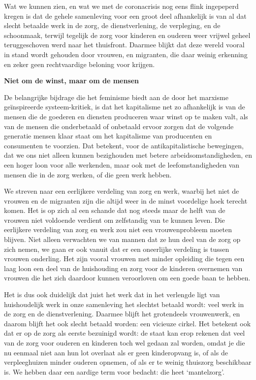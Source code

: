 Wat we kunnen zien, en wat we met de coronacrisis nog eens flink
ingepeperd kregen is dat de gehele samenleving voor een groot deel
afhankelijk is van al dat slecht betaalde werk in de zorg, de
dienstverlening, de verpleging, en de schoonmaak, terwijl tegelijk de
zorg voor kinderen en ouderen weer vrijwel geheel teruggeschoven werd
naar het thuisfront. Daarmee blijkt dat deze wereld vooral in stand
wordt gehouden door vrouwen, en migranten, die daar weinig erkenning en
zeker geen rechtvaardige beloning voor krijgen.

\textbf{Niet om de winst, maar om de mensen}

De belangrijke bijdrage die het feminisme biedt aan de door het marxisme
geïnspireerde systeem-kritiek, is dat het kapitalisme net zo afhankelijk
is van de mensen die de goederen en diensten produceren waar winst op te
maken valt, als van de mensen die onderbetaald of onbetaald ervoor
zorgen dat de volgende generatie mensen klaar staat om het kapitalisme
van producenten en consumenten te voorzien. Dat betekent, voor de
antikapitalistische bewegingen, dat we ons niet alleen kunnen
bezighouden met betere arbeidsomstandigheden, en een hoger loon voor
alle werkenden, maar ook met de leefomstandigheden van mensen die in de
zorg werken, of die geen werk hebben.

We streven naar een eerlijkere verdeling van zorg en werk, waarbij het
niet de vrouwen en de migranten zijn die altijd weer in de minst
voordelige hoek terecht komen. Het is op zich al een schande dat nog
steeds maar de helft van de vrouwen niet voldoende verdient om
zelfstandig van te kunnen leven. Die eerlijkere verdeling van zorg en
werk zou niet een vrouwenprobleem moeten blijven. Niet alleen verwachten
we van mannen dat ze hun deel van de zorg op zich nemen, we gaan er ook
vanuit dat er een oneerlijke verdeling is tussen vrouwen onderling. Het
zijn vooral vrouwen met minder opleiding die tegen een laag loon een
deel van de huishouding en zorg voor de kinderen overnemen van vrouwen
die het zich daardoor kunnen veroorloven om een goede baan te hebben.

Het is dus ook duidelijk dat juist het werk dat in het verlengde ligt
van huishoudelijk werk in onze samenleving het slechtst betaald wordt:
veel werk in de zorg en de dienstverlening. Daarmee blijft het
grotendeels vrouwenwerk, en daarom blijft het ook slecht betaald worden:
een vicieuze cirkel. Het betekent ook dat er op de zorg als eerste
bezuinigd wordt: de staat kan erop rekenen dat veel van de zorg voor
ouderen en kinderen toch wel gedaan zal worden, omdat je die nu eenmaal
niet aan hun lot overlaat als er geen kinderopvang is, of als de
verpleeghuizen minder ouderen opnemen, of als er te weinig thuiszorg
beschikbaar is. We hebben daar een aardige term voor bedacht: die heet
`mantelzorg'.

